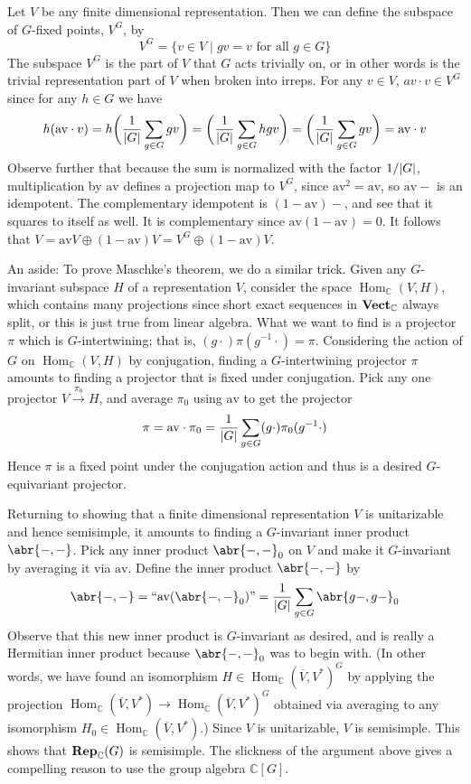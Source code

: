 \documentclass[11pt,leqno]{article}
\theoremstyle{plain}
\theoremstyle{definition}
\numberwithin{equation}{section}
\numberwithin{lem}{section}
\DeclareMathOperator{\Hom}{Hom}
\newcommand{\catname}[1]{{\normalfont\mathbf{#1}}}
\newcommand{\Vect}{\catname{Vect}}
\newcommand{\Rep}{\catname{Rep}}
\newcommand{\av}{\mathrm{av}}
\begin{document}
Let $V$ be any finite dimensional representation. Then we can define the subspace of $G$-fixed points, $V^G$, by
\[V^G = \{v\in V\mid gv = v\text{ for all }g\in G\}\]
The subspace $V^G$ is the part of $V$ that $G$ acts trivially on, or in other words is the trivial representation part of $V$ when broken into irreps. For any $v\in V$, $av\cdot v\in V^G$ since for any $h\in G$ we have
\[h(\av\cdot v) = h\biggl(\frac{1}{\abs{G}}\sum_{g\in G}gv\biggr) = \biggl(\frac{1}{\abs{G}}\sum_{g\in G}hgv\biggr) = \biggl(\frac{1}{\abs{G}}\sum_{g\in G}gv\biggr) = \av\cdot v\]
Observe further that because the sum is normalized with the factor $1/\abs{G}$, multiplication by $\av$ defines a projection map to $V^G$, since $\av^2 = \av$, so $\av-$ is an idempotent. The complementary idempotent is $(1-\av)-$, and see that it squares to itself as well. It is complementary since $\av(1-\av) = 0$. It follows that $V = \av V\oplus (1-\av)V = V^G\oplus (1-\av)V$.

An aside: To prove Maschke's theorem, we do a similar trick. Given any $G$-invariant subspace $H$ of a representation $V$, consider the space $\Hom_{\mathbb C}(V,H)$, which contains many projections since short exact sequences in $\Vect_{\mathbb C}$ always split, or this is just true from linear algebra. What we want to find is a projector $\pi$ which is $G$-intertwining; that is, $(g\cdot)\pi(g^{-1}\cdot) = \pi$. Considering the action of $G$ on $\Hom_{\mathbb C}(V,H)$ by conjugation, finding a $G$-intertwining projector $\pi$ amounts to finding a projector that is fixed under conjugation. Pick any one projector $V\xrightarrow{\pi_0}H$, and average $\pi_0$ using $\av$ to get the projector
\[\pi = \av\cdot\pi_0 = \frac{1}{\abs{G}}\sum_{g\in G}(g\cdot)\pi_0(g^{-1}\cdot)\]
Hence $\pi$ is a fixed point under the conjugation action and thus is a desired $G$-equivariant projector.

Returning to showing that a finite dimensional representation $V$ is unitarizable and hence semisimple, it amounts to finding a $G$-invariant inner product $\abr{-,-}$. Pick any inner product $\abr{-,-}_0$ on $V$ and make it $G$-invariant by averaging it via $\av$. Define the inner product $\abr{-,-}$ by 
\[\abr{-,-} = ``\av(\abr{-,-}_0)\textrm{''} = \frac{1}{\abs{G}}\sum_{g\in G}\abr{g-,g-}_0\]
Observe that this new inner product is $G$-invariant as desired, and is really a Hermitian inner product because $\abr{-,-}_0$ was to begin with. (In other words, we have found an isomorphism $H\in \Hom_{\mathbb C}(\overline V, V^\ast)^G$ by applying the projection $\Hom_{\mathbb C}(\overline V, V^\ast)\to \Hom_{\mathbb C}(\overline V, V^\ast)^G$ obtained via averaging to any isomorphism $H_0\in \Hom_{\mathbb C}(\overline V, V^\ast)$.) Since $V$ is unitarizable, $V$ is semisimple. This shows that $\Rep_{\mathbb C}(G)$ is semisimple. The slickness of the argument above gives a compelling reason to use the group algebra $\mathbb C[G]$.
\end{document}
